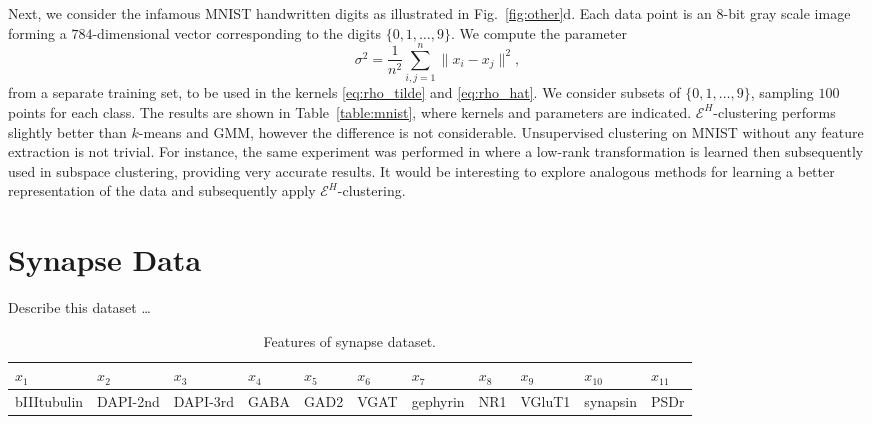 \documentclass[aps,preprint,nofootinbib,floatfix]{revtex4-1}
\begin{document}
Next, we consider 
the infamous MNIST handwritten digits
as illustrated in Fig.~\ref{fig:other}d.
Each data point is an $8$-bit gray scale
image forming a $784$-dimensional vector 
corresponding to the digits $\{0,1,\dotsc,9 \}$.
We compute the parameter
\begin{equation}
\label{eq:sigma}
\sigma^2 = \dfrac{1}{n^2} \sum_{i,j=1}^n \| x_i - x_j \|^2 ,
\end{equation}
from a separate
training set, to be used in the kernels \eqref{eq:rho_tilde} and 
\eqref{eq:rho_hat}.
We consider subsets of $\{0,1,\dotsc,9 \}$, 
sampling $100$ points 
for each class. 
The results are shown in Table~\ref{table:mnist}, where kernels
and parameters are indicated.
$\mathcal{E}^H$-clustering performs slightly better than $k$-means
and GMM, however the difference is not considerable.
Unsupervised clustering on MNIST without any feature extraction
is not trivial. For instance,
the same experiment was performed in \cite{Sapiro} where a low-rank
transformation is learned then subsequently used in subspace clustering,
providing very accurate results. It would be interesting to 
explore analogous methods
for learning a better representation of the data and subsequently apply
$\mathcal{E}^H$-clustering.


\section{Synapse Data}

Describe this dataset \ldots

\begin{table}[h]
\caption{\label{table:synapse}
Features of synapse dataset.
}
\begin{center}
\footnotesize{
\begin{tabular}{lllllllllll}
\toprule[1pt]
$x_{1}$ &
$x_{2}$ &
$x_{3}$ &
$x_{4}$ &
$x_{5}$ &
$x_{6}$ &
$x_{7}$ &
$x_{8}$ &
$x_{9}$ &
$x_{10}$ &
$x_{11}$ \\
\midrule[.5pt]
bIIItubulin&DAPI-2nd&DAPI-3rd&GABA&GAD2&VGAT&gephyrin&NR1&VGluT1&synapsin&PSDr
\\
\bottomrule[1pt]
\end{tabular}
}
\end{center}
\end{table}
\end{document}
